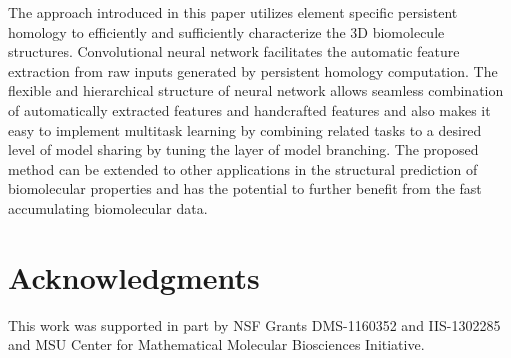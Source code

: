 \documentclass[10pt]{article}
\begin{document}

The approach introduced in this paper utilizes element specific persistent homology to efficiently and sufficiently characterize the 3D biomolecule structures. Convolutional neural network facilitates the automatic feature extraction from raw inputs generated by persistent homology computation. The flexible and hierarchical structure of neural network allows seamless combination of automatically extracted  features and handcrafted features  and also makes it easy to implement multitask learning by combining related tasks to a desired level of model sharing by tuning the layer of model branching. The proposed method can be extended to other applications in the structural prediction of biomolecular properties and has the potential to further benefit from the fast accumulating biomolecular data.

\section*{Acknowledgments}

This work was supported in part by NSF Grants DMS-1160352 and IIS-1302285     and
MSU Center for Mathematical Molecular Biosciences Initiative.

%
%


\end{document}

